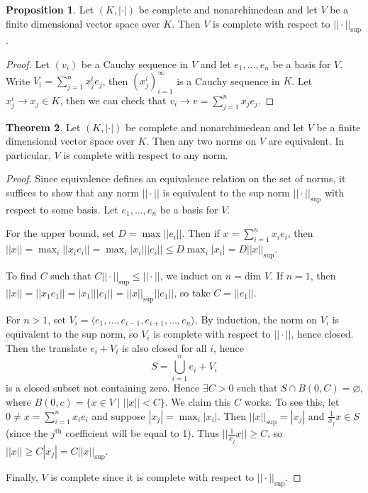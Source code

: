 \documentclass{article}
\theoremstyle{definition}
\newtheorem{theorem}{Theorem}[section]
\newtheorem{prop}[theorem]{Proposition}
\begin{document}
\begin{prop}
    Let $(K,|\cdot|)$ be complete and nonarchimedean and let $V$ be a finite dimensional vector space over $K$. Then $V$ is complete with respect to $||\cdot ||_{\text{sup}}$.
\end{prop}
\begin{proof}
    Let $(v_i)$ be a Cauchy sequence in $V$ and let $e_1,\ldots,e_n$ be a basis for $V$. Write $V_i = \sum_{j=1}^{n} x_j^i e_j$, then $(x^i_j)_{i=1}^{\infty}$ is a Cauchy sequence in $K$. Let $x_j^i \to x_j \in K$, then we can check that $v_i \to v = \sum_{j=1}^{n} x_je_j$.
\end{proof}
\begin{theorem}
    Let $(K,|\cdot|)$ be complete and nonarchimedean and let $V$ be a finite dimensional vector space over $K$. Then any two norms on $V$ are equivalent. In particular, $V$ is complete with respect to any norm.
\end{theorem}
\begin{proof}
    Since equivalence defines an equivalence relation on the set of norms, it suffices to show that any norm $||\cdot ||$ is equivalent to the sup norm $||\cdot ||_{\text{sup}}$ with respect to some basis. Let $e_1,\ldots,e_n$ be a basis for $V$.
    \vspace{1mm}
     
    For the upper bound, set $D = \max ||e_i||$. Then if $x = \sum_{i=1}^{n} x_i e_i$, then $||x|| = \max_i ||x_i e_i|| = \max_i |x_i|||e_i|| \le D \max_i |x_i| = D ||x||_{\text{sup}}$.
    \vspace{1mm}
     
    To find $C$ such that $C ||\cdot ||_{\text{sup}} \le ||\cdot ||$, we induct on $n = \text{dim }V$. If $n=1$, then $||x|| = ||x_1 e_1|| = |x_1|||e_1|| = ||x||_{\text{sup}}||e_1||$, so take $C = ||e_1||$.
    \vspace{1mm}
     
    For $n>1$, set $V_i = \langle e_1,\ldots,e_{i-1}, e_{i+1},\ldots,e_n \rangle$. By induction, the norm on $V_i$ is equivalent to the sup norm, so $V_i$ is complete with respect to $||\cdot||$, hence closed. Then the translate $e_i + V_i$ is also closed for all $i$, hence \[
    S = \bigcup_{i=1}^n e_i + V_i
    \]
    is a closed subset not containing zero. Hence $\exists C > 0$ such that $S \cap B(0,C) = \varnothing$, where $B(0,c) = \{x \in V \mid ||x||<C\}$. We claim this $C$ works. To see this, let $0 \neq x = \sum_{i=1}^{n} x_ie_i$ and suppose $|x_j| = \max_i |x_i|$. Then $||x||_{\text{sup}} = |x_j|$ and $\frac{1}{x_j}x \in S$ (since the $j^{\text{th}}$ coefficient will be equal to 1). Thus $||\frac{1}{x_j}x||\ge C$, so $||x||\ge C |x_j| = C ||x||_{\text{sup}}$.
    \vspace{1mm}
     
    Finally, $V$ is complete since it is complete with respect to $||\cdot||_{\text{sup}}$.
\end{proof}
\end{document}
